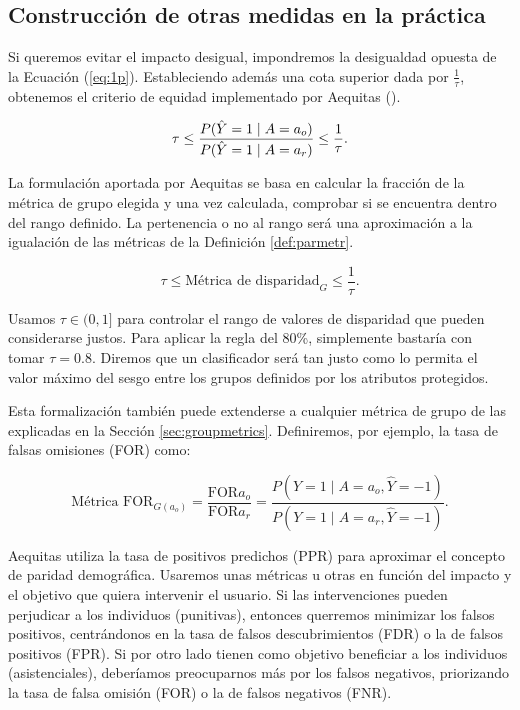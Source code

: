 \documentclass[oneside,openright,titlepage,numbers=noenddot,openany,headinclude,footinclude=true,
cleardoublepage=empty,abstractoff,BCOR=5mm,paper=a4,fontsize=12pt,main=spanish]{scrreprt}
\begin{document}
\subsection*{Construcción de otras medidas en la práctica}

Si queremos evitar el impacto desigual, impondremos la desigualdad opuesta de la Ecuación (\ref{eq:1p}). Estableciendo además una cota superior dada por $\frac{1}{\tau}$, obtenemos el criterio de equidad implementado por Aequitas (\cite{aequitas2019}). 

\begin{equation*}
\tau \leq \frac{\displaystyle P(\hat{Y}=1 \mid A=a_o)}{\displaystyle P(\hat{Y}=1 \mid A=a_r)} \leq \frac{1}{\tau}.
\end{equation*}

La formulación aportada por Aequitas se basa en calcular la fracción de la métrica de grupo elegida y una vez calculada, comprobar si se encuentra dentro del rango definido. La pertenencia o no al rango será una aproximación a la igualación de las métricas de la Definición \ref{def:parmetr}.

\begin{equation*}
\tau \leq \text{Métrica de disparidad}_{G} \leq \frac{1}{\tau}.
\end{equation*}

Usamos $\tau \in
(0,1]$ para controlar el rango de valores de disparidad que pueden considerarse justos. Para aplicar la regla del 80\%, simplemente bastaría con tomar $\tau=0.8$. Diremos que un clasificador será tan justo como lo permita el valor máximo del sesgo entre los grupos definidos por los atributos protegidos. 

Esta formalización también puede extenderse a cualquier métrica de grupo de las explicadas en la Sección \ref{sec:groupmetrics}. Definiremos, por ejemplo, la tasa de falsas omisiones (FOR) como:

\begin{equation*} 
\text{Métrica FOR}_{G(a_o)} =\frac{\text{FOR}{a_o}}{\text{FOR}{a_r}}=\frac{P(Y=1 \mid A=a_o, \hat{Y}=-1)}{P(Y=1 \mid A=a_r, \hat{Y}=-1)}.
\end{equation*}

Aequitas utiliza la tasa de positivos predichos (PPR) para aproximar el concepto de paridad demográfica. Usaremos unas métricas u otras en función del impacto y el objetivo que quiera intervenir el usuario. Si las intervenciones pueden perjudicar a los individuos (punitivas), entonces querremos minimizar los falsos positivos, centrándonos en la tasa de falsos descubrimientos (FDR) o la de falsos positivos (FPR). Si por otro lado tienen como objetivo beneficiar a los individuos (asistenciales), deberíamos preocuparnos más por los falsos negativos, priorizando la tasa de falsa omisión (FOR) o la de falsos negativos (FNR).
\end{document}
